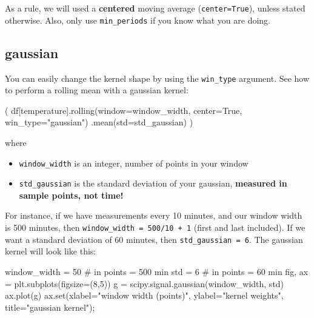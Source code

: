 \documentclass[
  letterpaper,
  DIV=11,
  numbers=noendperiod,
  oneside]{scrreprt}
\newenvironment{Shaded}{\begin{snugshade}}{\end{snugshade}}
\newcommand{\BuiltInTok}[1]{\textcolor[rgb]{0.00,0.23,0.31}{#1}}
\newcommand{\CommentTok}[1]{\textcolor[rgb]{0.37,0.37,0.37}{#1}}
\newcommand{\DecValTok}[1]{\textcolor[rgb]{0.68,0.00,0.00}{#1}}
\newcommand{\NormalTok}[1]{\textcolor[rgb]{0.00,0.23,0.31}{#1}}
\newcommand{\OperatorTok}[1]{\textcolor[rgb]{0.37,0.37,0.37}{#1}}
\newcommand{\StringTok}[1]{\textcolor[rgb]{0.13,0.47,0.30}{#1}}
\newcommand{\VariableTok}[1]{\textcolor[rgb]{0.07,0.07,0.07}{#1}}
\providecommand{\tightlist}{%
  \setlength{\itemsep}{0pt}\setlength{\parskip}{0pt}}\usepackage{longtable,booktabs,array}
\begin{document}
As a rule, we will used a \textbf{centered} moving average
(\texttt{center=True}), unless stated otherwise. Also, only use
\texttt{min\_periods} if you know what you are doing.

\hypertarget{gaussian}{%
\subsection{gaussian}\label{gaussian}}

You can easily change the kernel shape by using the \texttt{win\_type}
argument. See how to perform a rolling mean with a gaussian kernel:

\begin{Shaded}
\begin{Highlighting}[]
\NormalTok{(}
\NormalTok{df[}\StringTok{\textquotesingle{}temperature\textquotesingle{}}\NormalTok{].rolling(window}\OperatorTok{=}\NormalTok{window\_width,}
\NormalTok{                          center}\OperatorTok{=}\VariableTok{True}\NormalTok{,}
\NormalTok{                          win\_type}\OperatorTok{=}\StringTok{"gaussian"}\NormalTok{)}
\NormalTok{                 .mean(std}\OperatorTok{=}\NormalTok{std\_gaussian)}
\NormalTok{)}
\end{Highlighting}
\end{Shaded}

where

\begin{itemize}
\tightlist
\item
  \texttt{window\_width} is an integer, number of points in your window
\item
  \texttt{std\_gaussian} is the standard deviation of your gaussian,
  \textbf{measured in sample points, not time!}
\end{itemize}

For instance, if we have measurements every 10 minutes, and our window
width is 500 minutes, then \texttt{window\_width\ =\ 500/10\ +\ 1}
(first and last included). If we want a standard deviation of 60
minutes, then \texttt{std\_gaussian\ =\ 6}. The gaussian kernel will
look like this:

\begin{Shaded}
\begin{Highlighting}[]
\NormalTok{window\_width }\OperatorTok{=} \DecValTok{50}  \CommentTok{\# in points = 500 min}
\NormalTok{std }\OperatorTok{=} \DecValTok{6}  \CommentTok{\# in points = 60 min}
\NormalTok{fig, ax }\OperatorTok{=}\NormalTok{ plt.subplots(figsize}\OperatorTok{=}\NormalTok{(}\DecValTok{8}\NormalTok{,}\DecValTok{5}\NormalTok{))}
\NormalTok{g }\OperatorTok{=}\NormalTok{ scipy.signal.gaussian(window\_width, std)}
\NormalTok{ax.plot(g)}
\NormalTok{ax.}\BuiltInTok{set}\NormalTok{(xlabel}\OperatorTok{=}\StringTok{"window width (points)"}\NormalTok{,}
\NormalTok{       ylabel}\OperatorTok{=}\StringTok{"kernel weights"}\NormalTok{,}
\NormalTok{       title}\OperatorTok{=}\StringTok{"gaussian kernel"}\NormalTok{)}\OperatorTok{;}
\end{Highlighting}
\end{Shaded}
\end{document}
